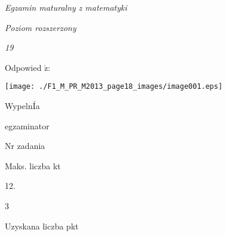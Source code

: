 \documentclass[a4paper,12pt]{article}
\begin{document}
{\it Egzamin maturalny z matematyki}

{\it Poziom rozszerzony}

{\it 19}

Odpowied $\acute{\mathrm{z}}$:
\begin{center}
\texttt{[image: ./F1\_M\_PR\_M2013\_page18\_images/image001.eps]}
\end{center}
WypelnÍa

egzaminator

Nr zadania

Maks. liczba kt

12.

3

Uzyskana liczba pkt
\end{document}
